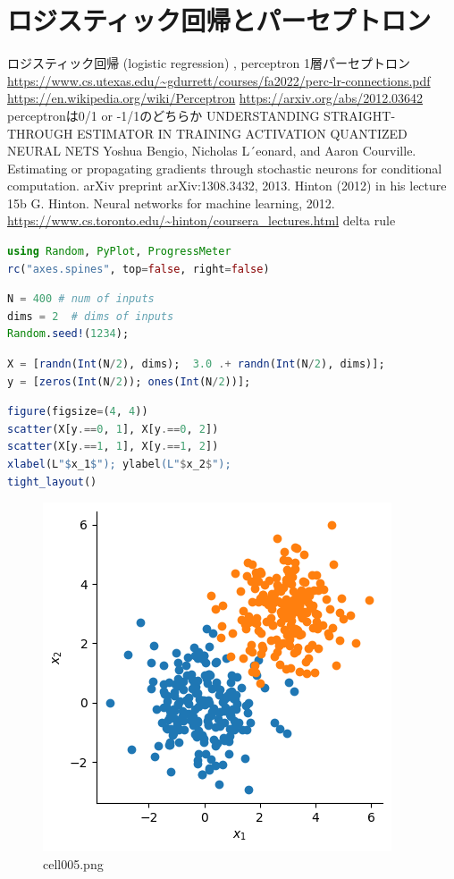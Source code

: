\section{ロジスティック回帰とパーセプトロン}
ロジスティック回帰 (logistic regression) 
, perceptron
1層パーセプトロン
\url{https://www.cs.utexas.edu/~gdurrett/courses/fa2022/perc-lr-connections.pdf}
\url{https://en.wikipedia.org/wiki/Perceptron}
\url{https://arxiv.org/abs/2012.03642}
perceptronは0/1 or -1/1のどちらか
UNDERSTANDING STRAIGHT-THROUGH ESTIMATOR IN TRAINING ACTIVATION QUANTIZED NEURAL NETS
Yoshua Bengio, Nicholas L´eonard, and Aaron Courville. Estimating or propagating gradients through stochastic neurons for conditional computation. arXiv preprint arXiv:1308.3432, 2013.
Hinton (2012) in his lecture 15b
G. Hinton. Neural networks for machine learning, 2012.
\url{https://www.cs.toronto.edu/~hinton/coursera_lectures.html}
delta rule
\begin{lstlisting}[language=julia]
using Random, PyPlot, ProgressMeter
rc("axes.spines", top=false, right=false)
\end{lstlisting}
\begin{lstlisting}[language=julia]
N = 400 # num of inputs
dims = 2  # dims of inputs 
Random.seed!(1234);
\end{lstlisting}
\begin{lstlisting}[language=julia]
X = [randn(Int(N/2), dims);  3.0 .+ randn(Int(N/2), dims)];
y = [zeros(Int(N/2)); ones(Int(N/2))];
\end{lstlisting}
\begin{lstlisting}[language=julia]
figure(figsize=(4, 4))
scatter(X[y.==0, 1], X[y.==0, 2])
scatter(X[y.==1, 1], X[y.==1, 2])
xlabel(L"$x_1$"); ylabel(L"$x_2$"); 
tight_layout()
\end{lstlisting}
\begin{figure}[ht]
	\centering
	\includegraphics[scale=0.8, max width=\linewidth]{./fig/local-learning-rule/logistic-regression-perceptron/cell005.png}
	\caption{cell005.png}
	\label{cell005.png}
\end{figure}
